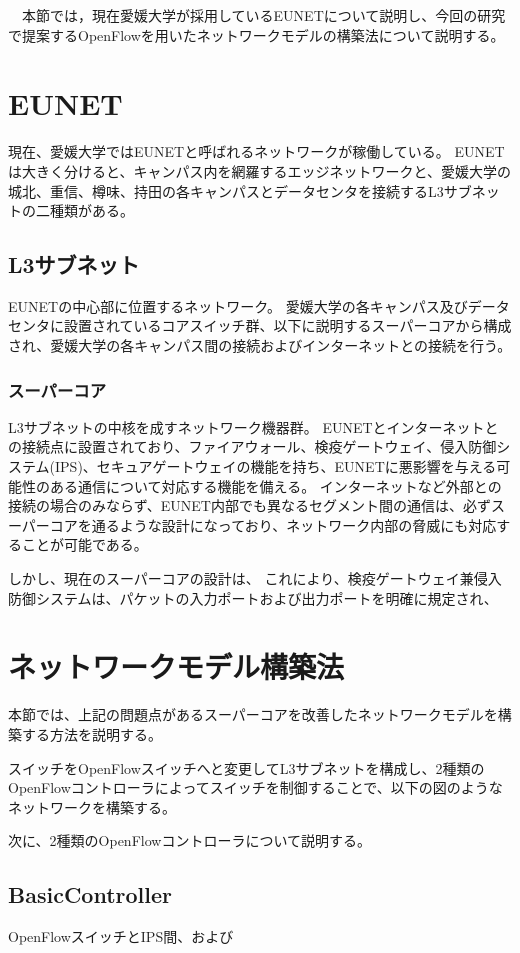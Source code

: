 　本節では，現在愛媛大学が採用しているEUNETについて説明し、今回の研究で提案するOpenFlowを用いたネットワークモデルの構築法について説明する。

\section{EUNET}

現在、愛媛大学ではEUNETと呼ばれるネットワークが稼働している。
EUNETは大きく分けると、キャンパス内を網羅するエッジネットワークと、愛媛大学の城北、重信、樽味、持田の各キャンパスとデータセンタを接続するL3サブネットの二種類がある。

\subsection{L3サブネット}

EUNETの中心部に位置するネットワーク。
愛媛大学の各キャンパス及びデータセンタに設置されているコアスイッチ群、以下に説明するスーパーコアから構成され、愛媛大学の各キャンパス間の接続およびインターネットとの接続を行う。

\subsubsection{スーパーコア}

L3サブネットの中核を成すネットワーク機器群。
EUNETとインターネットとの接続点に設置されており、ファイアウォール、検疫ゲートウェイ、侵入防御システム(IPS)、セキュアゲートウェイの機能を持ち、EUNETに悪影響を与える可能性のある通信について対応する機能を備える。
インターネットなど外部との接続の場合のみならず、EUNET内部でも異なるセグメント間の通信は、必ずスーパーコアを通るような設計になっており、ネットワーク内部の脅威にも対応することが可能である。

しかし、現在のスーパーコアの設計は、
これにより、検疫ゲートウェイ兼侵入防御システムは、パケットの入力ポートおよび出力ポートを明確に規定され、

\section{ネットワークモデル構築法}

本節では、上記の問題点があるスーパーコアを改善したネットワークモデルを構築する方法を説明する。

スイッチをOpenFlowスイッチへと変更してL3サブネットを構成し、2種類のOpenFlowコントローラによってスイッチを制御することで、以下の図のようなネットワークを構築する。


次に、2種類のOpenFlowコントローラについて説明する。

\subsection{BasicController}

OpenFlowスイッチとIPS間、および